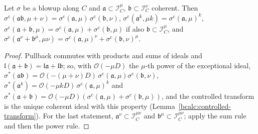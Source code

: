 \begin{lemma}
\label{hir:controlled-operations}
\mixedleanok
Let \(\sigma\) be a blowup along \(C\) and \(\mathfrak a\subset\mathcal I_C^\mu\), \(\mathfrak b\subset\mathcal I_C^\nu\) coherent. Then
\(\sigma^{\mathrm c}(\mathfrak a\mathfrak b,\mu+\nu)=\sigma^{\mathrm c}(\mathfrak a,\mu)\,\sigma^{\mathrm c}(\mathfrak b,\nu)\), \(\sigma^{\mathrm c}(\mathfrak a^k,\mu k)=\sigma^{\mathrm c}(\mathfrak a,\mu)^k\),
\(\sigma^{\mathrm c}(\mathfrak a+\mathfrak b,\mu)=\sigma^{\mathrm c}(\mathfrak a,\mu)+\sigma^{\mathrm c}(\mathfrak b,\mu)\) if also \(\mathfrak b\subset\mathcal I_C^\mu\), and
\(\sigma^{\mathrm c}(\mathfrak a^\nu+\mathfrak b^\mu,\mu\nu)=\sigma^{\mathrm c}(\mathfrak a,\mu)^\nu+\sigma^{\mathrm c}(\mathfrak b,\nu)^\mu\).
\end{lemma}
\begin{proof}
\mixedleanok
Pullback commutes with products and sums of ideals and \(\mathfrak l(\mathfrak a+\mathfrak b)=\mathfrak l\mathfrak a+\mathfrak l\mathfrak b\); so, with \(\mathcal O(-\mu D)\) the
\(\mu\)-th power of the exceptional ideal, \(\sigma^*(\mathfrak a\mathfrak b)=\mathcal O(-(\mu+\nu)D)\,\sigma^{\mathrm c}(\mathfrak a,\mu)\sigma^{\mathrm c}(\mathfrak b,\nu)\),
\(\sigma^*(\mathfrak a^k)=\mathcal O(-\mu kD)\,\sigma^{\mathrm c}(\mathfrak a,\mu)^k\) and
\(\sigma^*(\mathfrak a+\mathfrak b)=\mathcal O(-\mu D)(\sigma^{\mathrm c}(\mathfrak a,\mu)+\sigma^{\mathrm c}(\mathfrak b,\mu))\), and the controlled transform is the unique coherent
ideal with this property (Lemma~\ref{bcalc:controlled-transform}). For the last statement, \(\mathfrak a^\nu\subset\mathcal I_C^{\mu\nu}\) and
\(\mathfrak b^\mu\subset\mathcal I_C^{\mu\nu}\); apply the sum rule and then the power rule.
\end{proof}

